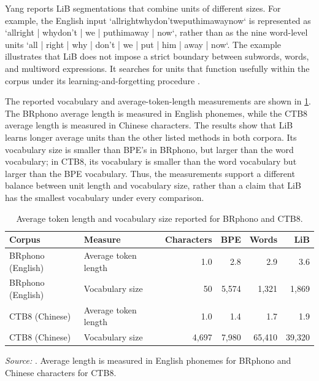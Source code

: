 

Yang reports LiB segmentations that combine units of different sizes. For example, the English input `allrightwhydon'tweputhimawaynow` is represented as `allright | whydon't | we | puthimaway | now`, rather than as the nine word-level units `all | right | why | don't | we | put | him | away | now`. The example illustrates that LiB does not impose a strict boundary between subwords, words, and multiword expressions. It searches for units that function usefully within the corpus under its learning-and-forgetting procedure \parencite{yang2024rethinking}.

The reported vocabulary and average-token-length measurements are shown in \cref{tab:tokenizer-lib-vocabulary}. The BRphono average length is measured in English phonemes, while the CTB8 average length is measured in Chinese characters. The results show that LiB learns longer average units than the other listed methods in both corpora. Its vocabulary size is smaller than BPE's in BRphono, but larger than the word vocabulary; in CTB8, its vocabulary is smaller than the word vocabulary but larger than the BPE vocabulary. Thus, the measurements support a different balance between unit length and vocabulary size, rather than a claim that LiB has the smallest vocabulary under every comparison.

\begin{table}[htbp]
    \centering
    \caption{Average token length and vocabulary size reported for BRphono and CTB8.}
    \label{tab:tokenizer-lib-vocabulary}
    \small\begin{tabularx}{\textwidth}{l>{\raggedright\arraybackslash}Xrrrr}
        \toprule
        Corpus & Measure & Characters & BPE & Words & LiB \\
        \midrule
        BRphono (English) & Average token length & 1.0 & 2.8 & 2.9 & 3.6 \\
        BRphono (English) & Vocabulary size & 50 & 5,574 & 1,321 & 1,869 \\
        CTB8 (Chinese) & Average token length & 1.0 & 1.4 & 1.7 & 1.9 \\
        CTB8 (Chinese) & Vocabulary size & 4,697 & 7,980 & 65,410 & 39,320 \\
        \bottomrule
    \end{tabularx}
    \par
    \smallskip
    \footnotesize\emph{Source:} \textcite{yang2024rethinking}. Average length is measured in English phonemes for BRphono and Chinese characters for CTB8.
\end{table}

